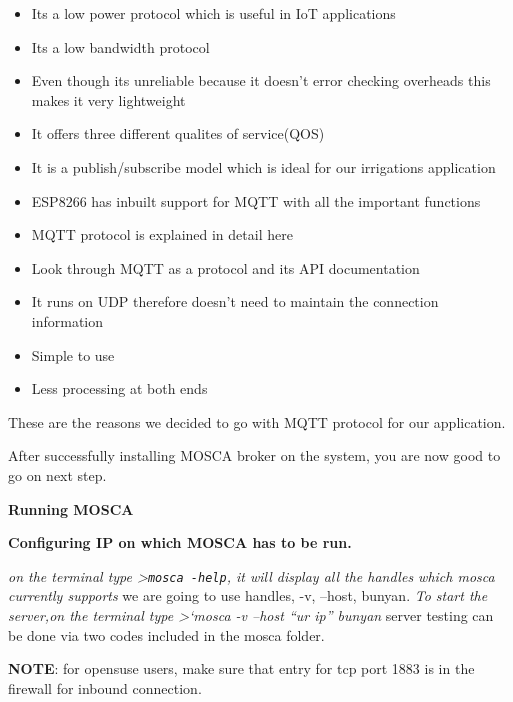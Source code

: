\documentclass[16pt]{article}
\begin{document}
\begin{itemize}

\item
  Its a low power protocol which is useful in IoT applications
\item
  Its a low bandwidth protocol
\item
  Even though its unreliable because it doesn't error checking overheads
  this makes it very lightweight
\item
  It offers three different qualites of service(QOS)
\item
  It is a publish/subscribe model which is ideal for our irrigations
  application
\item
  ESP8266 has inbuilt support for MQTT with all the important functions
\item
  MQTT protocol is explained in detail here
\item
  Look through MQTT as a protocol and its API documentation
\item
  It runs on UDP therefore doesn't need to maintain the connection
  information
\item
  Simple to use
\item
  Less processing at both ends
\end{itemize}

These are the reasons we decided to go with MQTT protocol for our
application.


\vspace{5cm}


After successfully installing MOSCA broker on the system, you are now
good to go on next step.

{\Large{\textbf{Running MOSCA}}}


{\Large{\textbf{Configuring IP on which MOSCA has to be run.}}}

\emph{on the terminal type \textgreater{}\texttt{mosca -help}, it will
display all the handles which mosca currently supports }we are going to
use handles, -v, --host, \textbar{} bunyan. \emph{To start the server,on
the terminal type \textgreater{}`mosca -v --host ``ur ip''
\textbar{}bunyan }server testing can be done via two codes included in
the mosca folder.

\textbf{NOTE}: for opensuse users, make sure that entry for tcp port
1883 is in the firewall for inbound connection.
\end{document}
